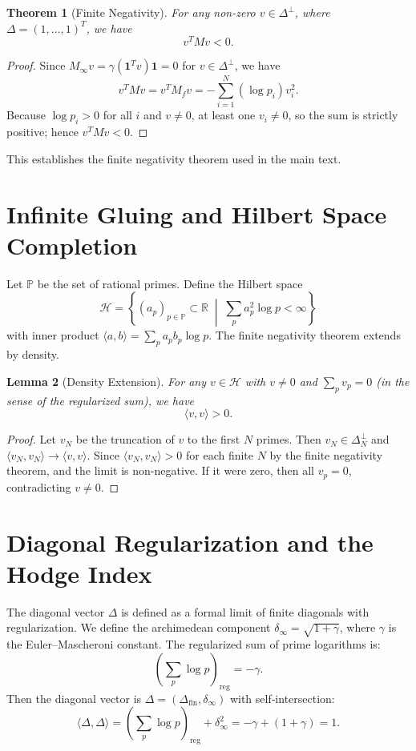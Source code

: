 \documentclass[11pt]{article}
\newcommand{\R}{\mathbb{R}}
\newtheorem{theorem}{Theorem}[section]
\newtheorem{lemma}[theorem]{Lemma}
\begin{document}
\begin{theorem}[Finite Negativity]
For any non-zero \( v \in \Delta^\perp \), where \( \Delta = (1,\dots,1)^T \), we have
\[
v^T M v < 0.
\]
\end{theorem}

\begin{proof}
Since \( M_\infty v = \gamma (\mathbf{1}^T v)\mathbf{1} = 0 \) for \( v \in \Delta^\perp \), we have
\[
v^T M v = v^T M_f v = -\sum_{i=1}^N (\log p_i) v_i^2.
\]
Because \( \log p_i > 0 \) for all \( i \) and \( v \neq 0 \), at least one \( v_i \neq 0 \), so the sum is strictly positive; hence \( v^T M v < 0 \).
\end{proof}

This establishes the finite negativity theorem used in the main text.

\section{Infinite Gluing and Hilbert Space Completion}
\label{sec:infinite-gluing}

Let \( \mathbb{P} \) be the set of rational primes. Define the Hilbert space
\[
\mathcal{H} = \left\{ (a_p)_{p\in\mathbb{P}} \subset \R \;\middle|\; \sum_{p} a_p^2 \log p < \infty \right\}
\]
with inner product \( \langle a,b\rangle = \sum_p a_p b_p \log p \). The finite negativity theorem extends by density.

\begin{lemma}[Density Extension]
For any \( v \in \mathcal{H} \) with \( v \neq 0 \) and \( \sum_p v_p = 0 \) (in the sense of the regularized sum), we have
\[
\langle v, v\rangle > 0.
\]
\end{lemma}

\begin{proof}
Let \( v_N \) be the truncation of \( v \) to the first \( N \) primes. Then \( v_N \in \Delta_N^\perp \) and \( \langle v_N, v_N\rangle \to \langle v, v\rangle \). Since \( \langle v_N, v_N\rangle > 0 \) for each finite \( N \) by the finite negativity theorem, and the limit is non-negative. If it were zero, then all \( v_p = 0 \), contradicting \( v \neq 0 \).
\end{proof}

\section{Diagonal Regularization and the Hodge Index}
\label{sec:diagonal}

The diagonal vector \( \Delta \) is defined as a formal limit of finite diagonals with regularization. We define the archimedean component \( \delta_\infty = \sqrt{1+\gamma} \), where \( \gamma \) is the Euler–Mascheroni constant. The regularized sum of prime logarithms is:
\[
\left( \sum_p \log p \right)_{\text{reg}} = -\gamma.
\]
Then the diagonal vector is \( \Delta = (\Delta_{\text{fin}}, \delta_\infty) \) with self‑intersection:
\[
\langle \Delta, \Delta \rangle = \left( \sum_p \log p \right)_{\text{reg}} + \delta_\infty^2 = -\gamma + (1+\gamma) = 1.
\]
\end{document}
